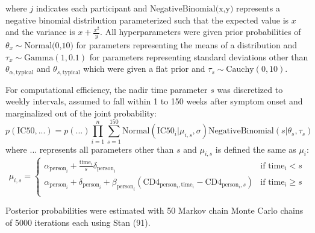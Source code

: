 \documentclass[12pt]{article}
\newcommand{\stanRef}{(91)}
\begin{document}
where $j$ indicates each participant and $\text{NegativeBinomial(x,y)}$ represents a negative binomial distribution parameterized such that the expected value is $x$ and the variance is $x+\frac{x^2}{y}$. All hyperparameters were given prior probabilities of $\theta_x \sim \text{Normal(0,10)}$ for parameters representing the means of a distribution and $\tau_x \sim \text{Gamma}(1,0.1)$ for parameters representing standard deviations other than $\theta_{\alpha,\text{typical}}$ and $\theta_{s,\text{typical}}$ which were given a flat prior and $\tau_s \sim \text{Cauchy}(0,10)$.

For computational efficiency, the nadir time parameter $s$ was discretized to weekly intervals, assumed to fall within 1 to 150 weeks after symptom onset and marginalized out of the joint probability:
\[p(\text{IC50},\text{...})=p(\text{...})\prod_{i=1}^n\sum_{s=1}^{150}\text{Normal}(\text{IC50}_i|\mu_{i,s},\sigma)\text{NegativeBinomial}(s|\theta_s,\tau_s)\]
where $\text{...}$ represents all parameters other than $s$ and $\mu_{i,s}$ is defined the same as $\mu_i$:
\[\mu_{i,s}=\begin{cases}
    \alpha_{\text{person}_i}+\frac{\text{time}_i}{s}\delta_{\text{person}_i} & \text{if } \text{time}_i<s\\
    \alpha_{\text{person}_i}+\delta_{\text{person}_i} + \beta_{\text{person}_i}(\text{CD4}_{\text{person$_i$},\text{time}_i}-\text{CD4}_{\text{person$_i$},s}) & \text{if } \text{time}_i\ge s\\
  \end{cases}
\]

Posterior probabilities were estimated with 50 Markov chain Monte Carlo chains of 5000 iterations each using Stan \stanRef{}.
\end{document}
